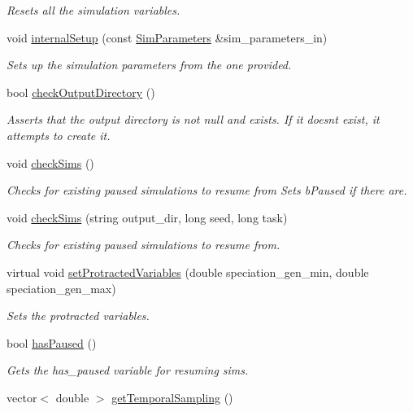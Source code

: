 \begin{DoxyCompactItemize}
\begin{DoxyCompactList}\small\item\em Resets all the simulation variables. \end{DoxyCompactList}\item 
void \hyperlink{class_tree_a62db83e47e5850c6a83793829b22b68b}{internal\+Setup} (const \hyperlink{struct_sim_parameters}{Sim\+Parameters} \&sim\+\_\+parameters\+\_\+in)
\begin{DoxyCompactList}\small\item\em Sets up the simulation parameters from the one provided. \end{DoxyCompactList}\item 
bool \hyperlink{class_tree_a5c6065ede9862e9fb6561eb8beaf5d78}{check\+Output\+Directory} ()
\begin{DoxyCompactList}\small\item\em Asserts that the output directory is not null and exists. If it doesn\textquotesingle{}t exist, it attempts to create it. \end{DoxyCompactList}\item 
void \hyperlink{class_tree_ad0bcc474a9ab1d4e3e2458c4de7304ad}{check\+Sims} ()
\begin{DoxyCompactList}\small\item\em Checks for existing paused simulations to resume from Sets b\+Paused if there are. \end{DoxyCompactList}\item 
void \hyperlink{class_tree_aafaede1da6c79583bf2e28b7a1881a5c}{check\+Sims} (string output\+\_\+dir, long seed, long task)
\begin{DoxyCompactList}\small\item\em Checks for existing paused simulations to resume from. \end{DoxyCompactList}\item 
virtual void \hyperlink{class_tree_a891764ffc1e29d3edbe0fd08e67a184b}{set\+Protracted\+Variables} (double speciation\+\_\+gen\+\_\+min, double speciation\+\_\+gen\+\_\+max)
\begin{DoxyCompactList}\small\item\em Sets the protracted variables. \end{DoxyCompactList}\item 
bool \hyperlink{class_tree_ae07761c0a91a44ebe459904b1b8ffb43}{has\+Paused} ()
\begin{DoxyCompactList}\small\item\em Gets the has\+\_\+paused variable for resuming sims. \end{DoxyCompactList}\item 
vector$<$ double $>$ \hyperlink{class_tree_ac03c034a5730ee4f4d8727aace776412}{get\+Temporal\+Sampling} ()\hypertarget{class_tree_ac03c034a5730ee4f4d8727aace776412}{}\label{class_tree_ac03c034a5730ee4f4d8727aace776412}


\end{DoxyCompactItemize}
